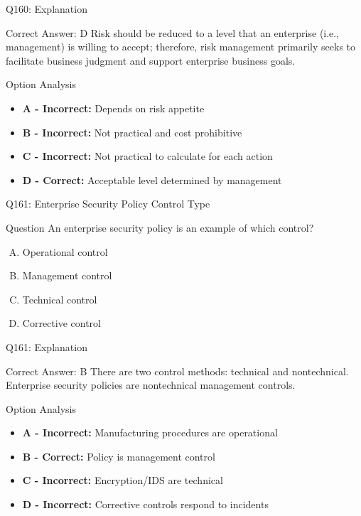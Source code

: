 \documentclass{beamer}
\begin{document}
	\begin{frame}{Q160: Explanation}
		\begin{block}{Correct Answer: D}
			Risk should be reduced to a level that an enterprise (i.e., management) is willing to accept; therefore, risk management primarily seeks to facilitate business judgment and support enterprise business goals.
		\end{block}
		\begin{block}{Option Analysis}
			\begin{itemize}
				\item \textbf{A - Incorrect:} Depends on risk appetite
				\item \textbf{B - Incorrect:} Not practical and cost prohibitive
				\item \textbf{C - Incorrect:} Not practical to calculate for each action
				\item \textbf{D - Correct:} Acceptable level determined by management
			\end{itemize}
		\end{block}
	\end{frame}
	
	\begin{frame}{Q161: Enterprise Security Policy Control Type}
		\begin{block}{Question}
			An enterprise security policy is an example of which control?
		\end{block}
		\begin{enumerate}[(A)]
			\item Operational control
			\item Management control
			\item Technical control
			\item Corrective control
		\end{enumerate}
	\end{frame}
	
	\begin{frame}{Q161: Explanation}
		\begin{block}{Correct Answer: B}
			There are two control methods: technical and nontechnical. Enterprise security policies are nontechnical management controls.
		\end{block}
		\begin{block}{Option Analysis}
			\begin{itemize}
				\item \textbf{A - Incorrect:} Manufacturing procedures are operational
				\item \textbf{B - Correct:} Policy is management control
				\item \textbf{C - Incorrect:} Encryption/IDS are technical
				\item \textbf{D - Incorrect:} Corrective controls respond to incidents
			\end{itemize}
		\end{block}
	\end{frame}
	
\end{document}
